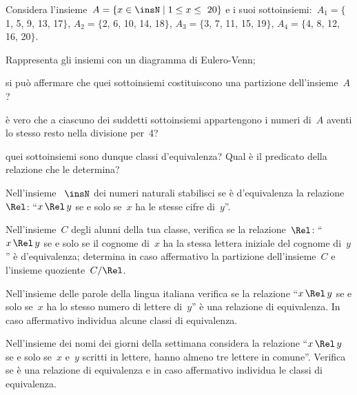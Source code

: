 \begin{multicols}{2}
\begin{esercizio}
\label{ese:\thechapter.30}
Considera l'insieme~$A = \{x\in\insN \mid  1 \le x \le~20 \}$ e i suoi
sottoinsiemi:~$A_1 =\{$1, 5, 9, 13, 17$\}$, $A_2 =\{$2, 6, 10, 14, 18$\}$, $A_3 =\{$3, 7, 11, 15, 19$\}$, $A_4 =\{$4, 8, 12, 16, 20$\}$.
\begin{enumeratea}
\item Rappresenta gli insiemi con un diagramma di Eulero-Venn;
\item si può affermare che quei sottoinsiemi costituiscono una partizione dell'insieme~$A$?
\item è vero che a ciascuno dei suddetti sottoinsiemi appartengono i numeri di~$A$ aventi lo stesso resto nella divisione per~4?
\item quei sottoinsiemi sono dunque classi d'equivalenza? Qual è il predicato della relazione che le determina?
\end{enumeratea}
\end{esercizio}

\begin{esercizio}
\label{ese:\thechapter.31}
Nell'insieme ~$\insN$ dei numeri naturali stabilisci se è d'equivalenza la relazione~$\Rel$: ``$x \,\Rel\, y$ se e solo se~$x$ ha le stesse cifre di~$y$''.
\end{esercizio}

\begin{esercizio}
\label{ese:\thechapter.32}
Nell'insieme~$C$ degli alunni della tua classe, verifica se la relazione~$\Rel$: ``$x \,\Rel\, y$ se e solo se il cognome di~$x$ ha la stessa lettera iniziale del
cognome di~$y$'' è d'equivalenza; determina in caso affermativo la partizione dell'insieme~$C$ e l'insieme quoziente~$C/\Rel$.
\end{esercizio}

\begin{esercizio}
\label{ese:\thechapter.33}
Nell'insieme delle parole della lingua italiana verifica se la relazione ``$x \,\Rel\, y$ se e solo se~$x$ ha lo stesso numero di lettere di~$y$'' è
una relazione di equivalenza. In caso affermativo individua alcune classi di
equivalenza.
\end{esercizio}

\begin{esercizio}
\label{ese:\thechapter.34}
Nell'insieme dei nomi dei giorni della settimana considera la relazione ``$x \,\Rel\, y$ se e solo se~$x$ e~$y$ scritti in lettere, hanno almeno tre lettere in comune''.
Verifica se è una relazione di equivalenza e in caso affermativo individua le
classi di equivalenza.
\end{esercizio}


\end{multicols}
